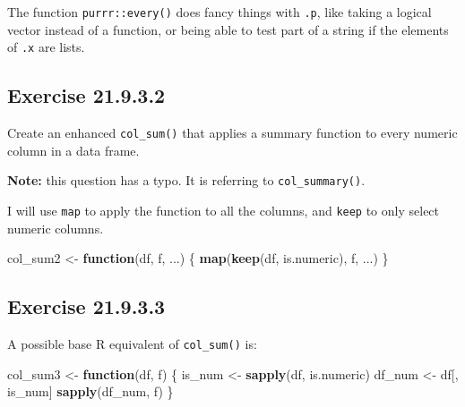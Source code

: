 \documentclass[]{book}
\newenvironment{Shaded}{\begin{snugshade}}{\end{snugshade}}
\newcommand{\CommentTok}[1]{\textcolor[rgb]{0.56,0.35,0.01}{\textit{#1}}}
\newcommand{\ControlFlowTok}[1]{\textcolor[rgb]{0.13,0.29,0.53}{\textbf{#1}}}
\newcommand{\KeywordTok}[1]{\textcolor[rgb]{0.13,0.29,0.53}{\textbf{#1}}}
\newcommand{\NormalTok}[1]{#1}
\newcommand{\StringTok}[1]{\textcolor[rgb]{0.31,0.60,0.02}{#1}}
\theoremstyle{plain}
\theoremstyle{remark}
\begin{document}
The function \texttt{purrr::every()} does fancy things with \texttt{.p},
like taking a logical vector instead of a function, or being able to
test part of a string if the elements of \texttt{.x} are lists.

\hypertarget{exercise-21.9.3.2}{%
\subsection*{\texorpdfstring{Exercise
{21.9.3.2}}{Exercise 21.9.3.2}}\label{exercise-21.9.3.2}}

Create an enhanced \texttt{col\_sum()} that applies a summary function
to every numeric column in a data frame.

\textbf{Note:} this question has a typo. It is referring to
\texttt{col\_summary()}.

I will use \texttt{map} to apply the function to all the columns, and
\texttt{keep} to only select numeric columns.

\begin{Shaded}
\begin{Highlighting}[]
\NormalTok{col_sum2 <-}\StringTok{ }\ControlFlowTok{function}\NormalTok{(df, f, ...) \{}
  \KeywordTok{map}\NormalTok{(}\KeywordTok{keep}\NormalTok{(df, is.numeric), f, ...)}
\NormalTok{\}}
\end{Highlighting}
\end{Shaded}

\begin{Shaded}
\end{Shaded}

\hypertarget{exercise-21.9.3.3}{%
\subsection*{\texorpdfstring{Exercise
{21.9.3.3}}{Exercise 21.9.3.3}}\label{exercise-21.9.3.3}}

A possible base R equivalent of \texttt{col\_sum()} is:

\begin{Shaded}
\begin{Highlighting}[]
\NormalTok{col_sum3 <-}\StringTok{ }\ControlFlowTok{function}\NormalTok{(df, f) \{}
\NormalTok{  is_num <-}\StringTok{ }\KeywordTok{sapply}\NormalTok{(df, is.numeric)}
\NormalTok{  df_num <-}\StringTok{ }\NormalTok{df[, is_num]}
  \KeywordTok{sapply}\NormalTok{(df_num, f)}
\NormalTok{\}}
\end{Highlighting}
\end{Shaded}
\end{document}
